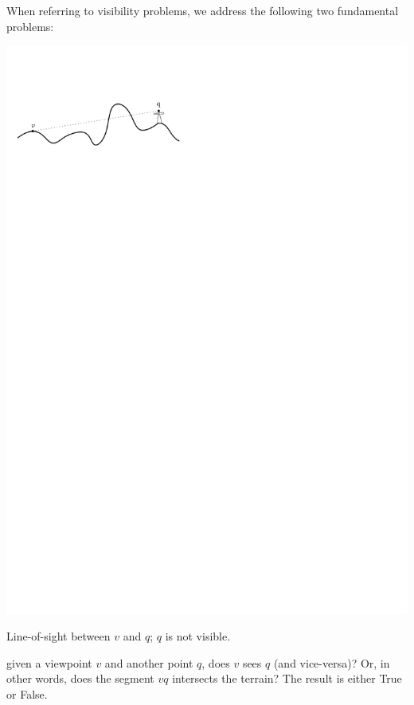 When referring to visibility problems, we address the following two fundamental problems:
\begin{description}
  \begin{marginfigure}
    \centering
    \includegraphics[width=\linewidth]{overview_los}
    \caption{Line-of-sight between $v$ and $q$; $q$ is not visible.}%
    \label{fig:overview_los}
  \end{marginfigure} 
  \item[line-of-sight (LoS):] given a viewpoint $v$ and another point $q$, does $v$ sees $q$ (and vice-versa)? Or, in other words, does the segment $vq$ intersects the terrain? The result is either True or False.
  \begin{marginfigure}
    \centering

\end{marginfigure}
\end{description}

